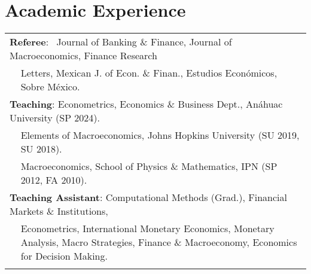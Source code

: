 \documentclass[12pt]{article}
\newcommand{\vsect}{\vspace{0.08cm}}
\begin{document}
	
	\section{Academic Experience} 
	\vsect
	\begin{tabular}{l m{15.3cm}}
		\multicolumn{2}{l}{\textbf{Referee}:  \, Journal of Banking \& Finance, Journal of Macroeconomics, Finance Research } \\
		& \vspace{-0.1cm} Letters, Mexican J. of Econ. \& Finan., Estudios Económicos, Sobre México. \\
		\multicolumn{2}{l}{\textbf{Teaching}: Econometrics, Economics \& Business Dept., Anáhuac University (SP 2024).} \\
		 & Elements of Macroeconomics, Johns Hopkins University (SU 2019, SU 2018). \\
		\qquad \qquad \, & Macroeconomics, School of Physics \& Mathematics, IPN (SP 2012, FA 2010). \\
		\multicolumn{2}{l}{\textbf{Teaching Assistant}: Computational Methods (Grad.), Financial Markets \& Institutions,} \\
		& \multirow{1}{14cm}{Econometrics, International Monetary Economics, Monetary Analysis, Macro Strategies, Finance \& Macroeconomy, Economics for Decision Making.} \\ %
		& \\ %
		
		
	\end{tabular}
	
\end{document}
